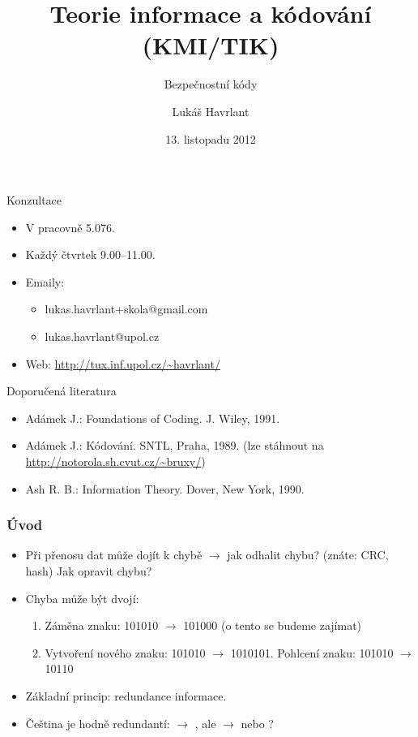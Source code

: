 \documentclass{beamer}
\title{Teorie informace a kódování (KMI/TIK)}
\subtitle{Bezpečnostní kódy}
\author{Lukáš Havrlant}
\date{13. listopadu 2012}
\institute{Univerzita Palackého}
\newenvironment{itemizex}%
  {\large \begin{itemize}%
    \setlength{\itemsep}{8pt}%
    \setlength{\parskip}{8pt}}%
  {\end{itemize}}
\begin{document}
\begin{frame}[t,plain]
\titlepage
\end{frame}


\begin{frame}[t,fragile]{Konzultace}
\begin{itemizex}
\item V pracovně 5.076.
\item Každý čtvrtek 9.00--11.00. 
\item Emaily:
  \begin{itemizex}
    \item lukas.havrlant+skola@gmail.com
    \item lukas.havrlant@upol.cz
  \end{itemizex}
\item Web: \url{http://tux.inf.upol.cz/~havrlant/}
\end{itemizex}
\end{frame}


\begin{frame}[t,fragile]{Doporučená literatura}
\begin{itemize}
    \item Adámek J.: Foundations of Coding. J. Wiley, 1991.
    \item Adámek J.: Kódování. SNTL, Praha, 1989. (lze stáhnout na \url{http://notorola.sh.cvut.cz/~bruxy/})
    \item Ash R. B.: Information Theory. Dover, New York, 1990.
\end{itemize}
\end{frame}


\begin{frame}[t,fragile]\frametitle{Úvod} 
    \begin{itemizex}
        \item Při přenosu dat může dojít k chybě $\longrightarrow$ jak odhalit chybu? (znáte: CRC, hash) Jak opravit chybu?
        \item Chyba může být dvojí:
            \begin{enumerate}
                \item Záměna znaku: 101010 $\longrightarrow$ 101000 (o tento se budeme zajímat)
                \item Vytvoření nového znaku: 101010 $\longrightarrow$ 1010101. Pohlcení znaku: 101010 $\longrightarrow$ 10110
            \end{enumerate}
        \item Základní princip: redundance informace. 
        \item Čeština je hodně redundantí:  $\longrightarrow$ , ale  $\longrightarrow$  nebo ?
    \end{itemizex}
\end{frame}
\end{document}
